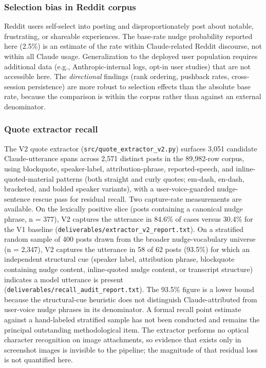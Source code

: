 \documentclass[11pt]{article}
\begin{document}
\subsubsection{Selection bias in Reddit corpus}

Reddit users self-select into posting and disproportionately post about notable, frustrating, or shareable experiences. The base-rate nudge probability reported here (2.5\%) is an estimate of the rate within Claude-related Reddit discourse, not within all Claude usage. Generalization to the deployed user population requires additional data (e.g., Anthropic-internal logs, opt-in user studies) that are not accessible here. The \emph{directional} findings (rank ordering, pushback rates, cross-session persistence) are more robust to selection effects than the absolute base rate, because the comparison is within the corpus rather than against an external denominator.

\subsubsection{Quote extractor recall}

The V2 quote extractor (\texttt{src/quote\_extractor\_v2.py}) surfaces 3,051 candidate Claude-utterance spans across 2,571 distinct posts in the 89,982-row corpus, using blockquote, speaker-label, attribution-phrase, reported-speech, and inline-quoted-material patterns (both straight and curly quotes; em-dash, en-dash, bracketed, and bolded speaker variants), with a user-voice-guarded nudge-sentence rescue pass for residual recall. Two capture-rate measurements are available. On the lexically positive slice (posts containing a canonical nudge phrase, n = 377), V2 captures the utterance in 84.6\% of cases versus 30.4\% for the V1 baseline (\texttt{deliverables/extractor\_v2\_report.txt}). On a stratified random sample of 400 posts drawn from the broader nudge-vocabulary universe (n = 2,347), V2 captures the utterance in 58 of 62 posts (93.5\%) for which an independent structural cue (speaker label, attribution phrase, blockquote containing nudge content, inline-quoted nudge content, or transcript structure) indicates a model utterance is present (\texttt{deliverables/recall\_audit\_report.txt}). The 93.5\% figure is a lower bound because the structural-cue heuristic does not distinguish Claude-attributed from user-voice nudge phrases in its denominator. A formal recall point estimate against a hand-labeled stratified sample has not been conducted and remains the principal outstanding methodological item. The extractor performs no optical character recognition on image attachments, so evidence that exists only in screenshot images is invisible to the pipeline; the magnitude of that residual loss is not quantified here.
\end{document}
